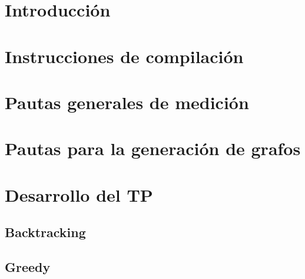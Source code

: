 \documentclass[12pt, a4paper, twoside]{article}
\begin{document}
{}

\newpage{\pagestyle{empty}\cleardoublepage}
\setcounter{page}{1}

\newpage{\pagestyle{empty}\tableofcontents\cleardoublepage}

\begin{TP3}
\section{Introducción}\label{sec:introduccion}

\newpage
\section{Instrucciones de compilación}\label{sec:instrucciones}

\newpage

\section{Pautas generales de medición}\label{sec:medicion}

\newpage

\section{Pautas para la generación de grafos}\label{sec:generacion}

\newpage

\section{Desarrollo del TP}\label{sec:desarrollo}
  
  \subsection{Backtracking}\label{subsec:backtracking}
  
  \newpage

  \subsection{Greedy}\label{subsec:greedy}
  
  \newpage


\end{TP3}
\end{document}
